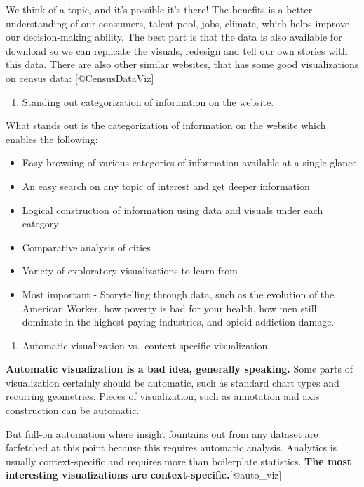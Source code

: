 \documentclass[]{book}
\providecommand{\tightlist}{%
  \setlength{\itemsep}{0pt}\setlength{\parskip}{0pt}}
\theoremstyle{definition}
\theoremstyle{definition}
\theoremstyle{definition}
\theoremstyle{remark}
\begin{document}
We think of a topic, and it's possible it's there! The benefits is a
better understanding of our consumers, talent pool, jobs, climate, which
helps improve our decision-making ability. The best part is that the
data is also available for download so we can replicate the visuals,
redesign and tell our own stories with this data. There are also other
similar websites, that has some good visualizations on census data:
{[}@CensusDataViz{]}

\begin{enumerate}
\def\labelenumi{\arabic{enumi}.}
\setcounter{enumi}{1}
\tightlist
\item
  Standing out categorization of information on the website.
\end{enumerate}

What stands out is the categorization of information on the website
which enables the following:

\begin{itemize}
\tightlist
\item
  Easy browsing of various categories of information available at a
  single glance
\item
  An easy search on any topic of interest and get deeper information
\item
  Logical construction of information using data and visuals under each
  category
\item
  Comparative analysis of cities
\item
  Variety of exploratory visualizations to learn from
\item
  Most important - Storytelling through data, such as the evolution of
  the American Worker, how poverty is bad for your health, how men still
  dominate in the highest paying industries, and opioid addiction
  damage.
\end{itemize}

\begin{enumerate}
\def\labelenumi{\arabic{enumi}.}
\setcounter{enumi}{2}
\tightlist
\item
  Automatic visualization vs.~context-specific visualization
\end{enumerate}

\textbf{Automatic visualization is a bad idea, generally speaking.} Some
parts of visualization certainly should be automatic, such as standard
chart types and recurring geometries. Pieces of visualization, such as
annotation and axis construction can be automatic.

But full-on automation where insight fountains out from any dataset are
farfetched at this point because this requires automatic analysis.
Analytics is usually context-specific and requires more than boilerplate
statistics. \textbf{The most interesting visualizations are
context-specific.}{[}@auto\_viz{]}
\end{document}
